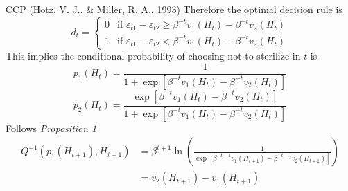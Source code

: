 \documentclass[10pt]{beamer}
\begin{document}
\begin{frame}{CCP (Hotz, V. J., \& Miller, R. A., 1993)}
Therefore the optimal decision rule is 
\begin{equation*}
d_t=\begin{cases}
	0 & \text{if }\varepsilon_{t1}-\varepsilon_{t2}\geq \beta^{-t}v_1(H_t)- \beta^{-t}v_2(H_t)\\
	1 & \text{if }\varepsilon_{t1}-\varepsilon_{t2}< \beta^{-t}v_1(H_t)- \beta^{-t}v_2(H_t)
	\end{cases}	
\end{equation*}
This implies the conditional probability of choosing not to sterilize in $t$ is 
$$p_1(H_t)= \frac{1}{1+\exp[\beta^{-t}v_1(H_t)- \beta^{-t}v_2(H_t)]}$$
$$p_2(H_t)= \frac{\exp[\beta^{-t}v_1(H_t)- \beta^{-t}v_2(H_t)]}{1+\exp[\beta^{-t}v_1(H_t)- \beta^{-t}v_2(H_t)]}$$
Follows \textit{Proposition 1} 
\begin{align*}
	Q^{-1}(p_1(H_{t+1}),H_{t+1})&=\beta^{t+1}\ln(\frac{1}{\exp[\beta^{-t-1}v_1(H_{t+1})- \beta^{-t-1}v_2(H_{t+1})]})\\
	&=v_2(H_{t+1})-v_1(H_{t+1})
\end{align*}
\end{frame}
\end{document}

